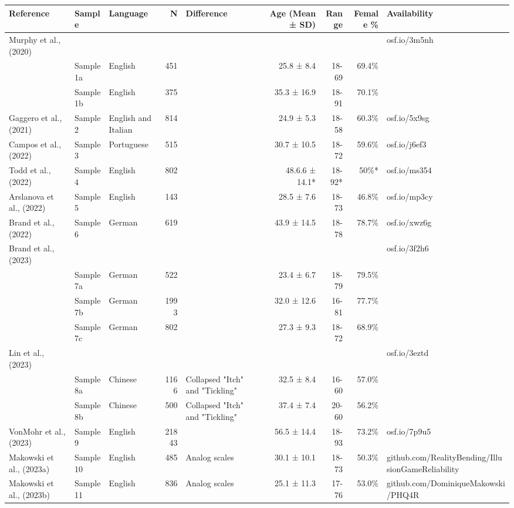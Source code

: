 \begin{table}[!t]
\fontsize{6.8pt}{8.1pt}\selectfont
\begin{tabular*}{\linewidth}{@{\extracolsep{\fill}}lllrlrrrl}
\toprule
Reference & Sample & Language & N & Difference & Age (Mean  ± SD) & Range & Female \% & Availability \\ 
\midrule\addlinespace[2.5pt]
Murphy et al., (2020) &  &  &  &  &  &  &  & osf.io/3m5nh \\ 
 & Sample 1a & English & 451 &  & 25.8 ± 8.4 & 18-69 & 69.4\% &  \\ 
 & Sample 1b & English & 375 &  & 35.3 ± 16.9 & 18-91 & 70.1\% &  \\ 
Gaggero et al., (2021) & Sample 2 & English and Italian & 814 &  & 24.9 ± 5.3 & 18-58 & 60.3\% & osf.io/5x9sg \\ 
Campos et al., (2022) & Sample 3 & Portuguese & 515 &  & 30.7 ± 10.5 & 18-72 & 59.6\% & osf.io/j6ef3 \\ 
Todd et al., (2022) & Sample 4 & English & 802 &  & 48.6.6 ± 14.1* & 18-92* & 50\%* & osf.io/ms354 \\ 
Arslanova et al., (2022) & Sample 5 & English & 143 &  & 28.5 ± 7.6 & 18-73 & 46.8\% & osf.io/mp3cy \\ 
Brand et al., (2022) & Sample 6 & German & 619 &  & 43.9 ± 14.5 & 18-78 & 78.7\% & osf.io/xwz6g \\ 
Brand et al., (2023) &  &  &  &  &  &  &  & osf.io/3f2h6 \\ 
 & Sample 7a & German & 522 &  & 23.4 ± 6.7 & 18-79 & 79.5\% &  \\ 
 & Sample 7b & German & 1993 &  & 32.0 ± 12.6 & 16-81 & 77.7\% &  \\ 
 & Sample 7c & German & 802 &  & 27.3 ± 9.3 & 18-72 & 68.9\% &  \\ 
Lin et al., (2023) &  &  &  &  &  &  &  & osf.io/3eztd \\ 
 & Sample 8a & Chinese & 1166 & Collapsed "Itch" and "Tickling" & 32.5 ± 8.4 & 16-60 & 57.0\% &  \\ 
 & Sample 8b & Chinese & 500 & Collapsed "Itch" and "Tickling" & 37.4 ± 7.4 & 20-60 & 56.2\% &  \\ 
VonMohr et al., (2023) & Sample 9 & English & 21843 &  & 56.5 ± 14.4 & 18-93 & 73.2\% & osf.io/7p9u5 \\ 
Makowski et al., (2023a) & Sample 10 & English & 485 & Analog scales & 30.1 ± 10.1 & 18-73 & 50.3\% & github.com/RealityBending/IllusionGameReliability \\ 
Makowski et al., (2023b) & Sample 11 & English & 836 & Analog scales & 25.1 ± 11.3 & 17-76 & 53.0\% & github.com/DominiqueMakowski/PHQ4R \\ 

\end{tabular*}
\end{table}
